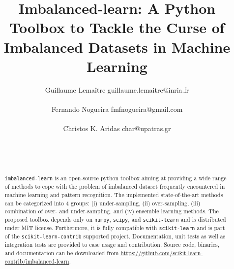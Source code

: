\documentclass[twoside,11pt]{article}
\begin{document}
\title{Imbalanced-learn: A Python Toolbox to Tackle the Curse of Imbalanced Datasets in Machine Learning}
\author{Guillaume Lema\^itre \email guillaume.lemaitre@inria.fr \\
   \\
  \AND
  Fernando Nogueira \email fmfnogueira@gmail.com \\
   \\
  \AND
  Christos K. Aridas \email char@upatras.gr \\
   \\
   \\
   \\
  }

\maketitle

\begin{abstract}%
  \texttt{imbalanced-learn} is an open-source python toolbox aiming at providing a wide range of methods to cope with the problem of imbalanced dataset frequently encountered in machine learning and pattern recognition.
  The implemented state-of-the-art methods can be categorized into 4 groups: (i) under-sampling, (ii) over-sampling, (iii) combination of over- and under-sampling, and (iv) ensemble learning methods.
  The proposed toolbox depends only on \texttt{numpy}, \texttt{scipy}, and \texttt{scikit-learn} and is distributed under MIT license.
  Furthermore, it is fully compatible with \texttt{scikit-learn} and is part of the \texttt{scikit-learn-contrib} supported project.
  Documentation, unit tests as well as integration tests are provided to ease usage and contribution.
  Source code, binaries, and documentation can be downloaded from \url{https://github.com/scikit-learn-contrib/imbalanced-learn}.
\end{abstract}
\end{document}
